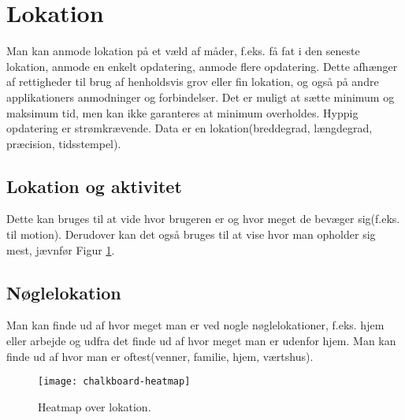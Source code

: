 \section{Lokation}
Man kan anmode lokation på et væld af måder, f.eks. få fat i den seneste lokation, anmode en enkelt opdatering, anmode flere opdatering. 
Dette afhænger af rettigheder til brug af henholdsvis grov eller fin lokation, og også på andre applikationers anmodninger og forbindelser. Det er muligt at sætte minimum og maksimum tid, men kan ikke garanteres at minimum overholdes. Hyppig opdatering er strømkrævende. 
Data er en lokation(breddegrad, længdegrad, præcision, tidsstempel).

\subsection{Lokation og aktivitet}
Dette kan bruges til at vide hvor brugeren er og hvor meget de bevæger sig(f.eks. til motion).
Derudover kan det også bruges til at vise hvor man opholder sig mest, jævnfør Figur \ref{heatmap}.
\subsection{Nøglelokation}
Man kan finde ud af hvor meget man er ved nogle nøglelokationer, f.eks. hjem eller arbejde og udfra det finde ud af hvor meget man er udenfor hjem. Man kan finde ud af hvor man er oftest(venner, familie, hjem, værtshus).

\begin{figure}[h]
	\centering
	\texttt{[image: chalkboard-heatmap]}
	\caption{Heatmap over lokation.}\label{heatmap}
\end{figure}
